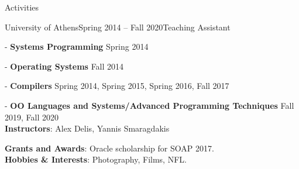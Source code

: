 \documentclass{resume}
\begin{document}
\begin{rSection}{Activities}
\begin{rSubsection}{University of Athens}{Spring 2014 -- Fall 2020}{Teaching Assistant}{}

    \item[-] {\bf Systems Programming}  Spring 2014
    \item[-] {\bf Operating Systems}  Fall 2014
    \item[-] {\bf Compilers} Spring 2014, Spring 2015, Spring 2016, Fall 2017
    \item[-] {\bf OO Languages and Systems/Advanced Programming Techniques} Fall 2019, Fall 2020
    \\
  {\bf Instructors}: Alex Delis, Yannis Smaragdakis

  {\bf Grants and Awards}: Oracle scholarship for SOAP 2017. \\
  {\bf Hobbies \& Interests}: Photography, Films, NFL.
\end{rSubsection}
\end{rSection}
\end{document}
